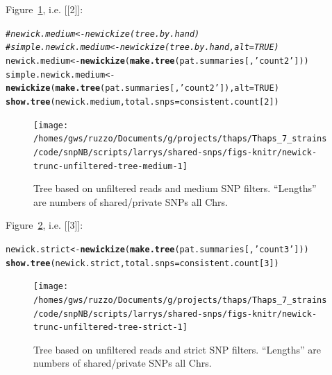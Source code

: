 \documentclass{article}\usepackage[]{graphicx}\usepackage[]{color}
\makeatletter
\newcommand{\hlnum}[1]{\textcolor[rgb]{0.686,0.059,0.569}{#1}}%
\newcommand{\hlstr}[1]{\textcolor[rgb]{0.192,0.494,0.8}{#1}}%
\newcommand{\hlcom}[1]{\textcolor[rgb]{0.678,0.584,0.686}{\textit{#1}}}%
\newcommand{\hlstd}[1]{\textcolor[rgb]{0.345,0.345,0.345}{#1}}%
\newcommand{\hlkwb}[1]{\textcolor[rgb]{0.69,0.353,0.396}{#1}}%
\newcommand{\hlkwc}[1]{\textcolor[rgb]{0.333,0.667,0.333}{#1}}%
\newcommand{\hlkwd}[1]{\textcolor[rgb]{0.737,0.353,0.396}{\textbf{#1}}}%
\newenvironment{kframe}{%
 \def\at@end@of@kframe{}%
 \ifinner\ifhmode%
  \def\at@end@of@kframe{\end{minipage}}%
  \begin{minipage}{\columnwidth}%
 \fi\fi%
 \def\FrameCommand##1{\hskip\@totalleftmargin \hskip-\fboxsep
 \colorbox{shadecolor}{##1}\hskip-\fboxsep
     \hskip-\linewidth \hskip-\@totalleftmargin \hskip\columnwidth}%
 \MakeFramed {\advance\hsize-\width
   \@totalleftmargin\z@ \linewidth\hsize
   \@setminipage}}%
 {\par\unskip\endMakeFramed%
 \at@end@of@kframe}
\newenvironment{knitrout}{}{} %
\makeatother
\begin{document}
Figure~\ref{fig:tree-medium}, i.e. [[2]]:

\begin{knitrout}\scriptsize
{}\color{fgcolor}\begin{kframe}
\begin{alltt}
\hlcom{# newick.medium <- newickize(tree.by.hand)}
\hlcom{# simple.newick.medium <- newickize(tree.by.hand,alt=TRUE)}
\hlstd{newick.medium} \hlkwb{<-} \hlkwd{newickize}\hlstd{(}\hlkwd{make.tree}\hlstd{(pat.summaries[,}\hlstr{'count2'}\hlstd{]))}
\hlstd{simple.newick.medium} \hlkwb{<-} \hlkwd{newickize}\hlstd{(}\hlkwd{make.tree}\hlstd{(pat.summaries[,}\hlstr{'count2'}\hlstd{]),}\hlkwc{alt}\hlstd{=}\hlnum{TRUE}\hlstd{)}
\hlkwd{show.tree}\hlstd{(newick.medium,} \hlkwc{total.snps}\hlstd{=consistent.count[}\hlnum{2}\hlstd{])}
\end{alltt}
\end{kframe}\begin{figure}

{\centering \texttt{[image: /homes/gws/ruzzo/Documents/g/projects/thaps/Thaps\_7\_strains/code/snpNB/scripts/larrys/shared-snps/figs-knitr/newick-trunc-unfiltered-tree-medium-1]} 

}

\caption[Tree based on unfiltered reads and medium SNP filters]{Tree based on unfiltered reads and medium SNP filters.  ``Lengths'' are numbers of shared/private SNPs all Chrs.}\label{fig:tree-medium}
\end{figure}


\end{knitrout}

Figure~\ref{fig:tree-strict}, i.e. [[3]]:

\begin{knitrout}\scriptsize
{}\color{fgcolor}\begin{kframe}
\begin{alltt}
\hlstd{newick.strict} \hlkwb{<-} \hlkwd{newickize}\hlstd{(}\hlkwd{make.tree}\hlstd{(pat.summaries[,}\hlstr{'count3'}\hlstd{]))}
\hlkwd{show.tree}\hlstd{(newick.strict,} \hlkwc{total.snps}\hlstd{=consistent.count[}\hlnum{3}\hlstd{])}
\end{alltt}
\end{kframe}\begin{figure}

{\centering \texttt{[image: /homes/gws/ruzzo/Documents/g/projects/thaps/Thaps\_7\_strains/code/snpNB/scripts/larrys/shared-snps/figs-knitr/newick-trunc-unfiltered-tree-strict-1]} 

}

\caption[Tree based on unfiltered reads and strict SNP filters]{Tree based on unfiltered reads and strict SNP filters.  ``Lengths'' are numbers of shared/private SNPs all Chrs.}\label{fig:tree-strict}
\end{figure}


\end{knitrout}
\end{document}
